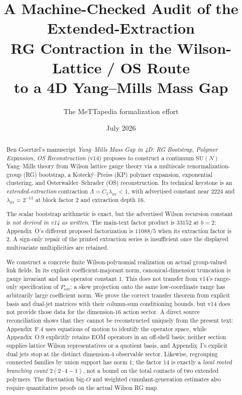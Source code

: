 \documentclass[11pt]{article}
\title{A Machine-Checked Audit of the Extended-Extraction\\
RG Contraction in the Wilson-Lattice / OS Route\\
to a 4D Yang--Mills Mass Gap}
\author{The MeTTapedia formalization effort}
\date{July 2026}
\theoremstyle{definition}
\newcommand{\SUN}{\mathrm{SU}(N)}
\newcommand{\Lirr}{\lambda_{\mathrm{irr}}}
\begin{document}
\maketitle
\sloppy

\begin{abstract}
Ben Goertzel's manuscript \emph{Yang--Mills Mass Gap in 4D: RG Bootstrap,
Polymer Expansion, OS Reconstruction} (v14) proposes to construct a continuum
$\SUN$ Yang--Mills theory from Wilson lattice gauge theory via a multiscale
renormalization-group (RG) bootstrap, a Koteck\'y--Preiss (KP) polymer expansion,
exponential clustering, and Osterwalder--Schrader (OS) reconstruction. Its
technical keystone is an \emph{extended-extraction} contraction
$\Lambda=C_1\Lirr<1$, with advertised constant near $2224$ and
$\Lirr=2^{-13}$ at block factor $2$ and extraction depth $16$.

The scalar bootstrap arithmetic is exact, but the advertised Wilson recursion
constant is \emph{not derived in v14 as written}. The main-text factor product
is $33152$ at $b=2$; Appendix~O's different proposed factorization is
$11088/5$ when its extraction factor is $2$. A sign-only repair of the printed
extraction series is insufficient once the displayed multivariate
multiplicities are retained.

We construct a concrete finite Wilson-polynomial realization on actual
group-valued link fields. In its explicit coefficient-majorant norm,
canonical-dimension truncation is gauge invariant and has operator constant
$1$. This does not transfer from v14's range-only specification of
$P_{\mathrm{ext}}$: a skew projection onto the same low-coordinate range has
arbitrarily large coefficient norm. We prove the correct transfer theorem from
explicit basis and dual-jet matrices with their column-sum conditioning bounds,
but v14 does not provide those data for the dimension-$16$ action sector. A
direct source reconciliation shows that they cannot be reconstructed uniquely
from the present text: Appendix~F.4 uses equations of motion to identify the
operator space, while Appendix~O.9 explicitly retains EOM operators in an
off-shell basis; neither section supplies lattice Wilson representatives or a
quotient basis, and Appendix~I's explicit dual jets stop at the distinct
dimension-$4$ observable sector.
Likewise, regrouping connected families by union support has norm $1$; the
factor $14$ is exactly a \emph{local rooted branching count}
$2(2\cdot4-1)$, not a bound on the total contacts of two extended polymers.
The fluctuation big-$O$ and weighted cumulant-generation estimates also require
quantitative proofs on the actual Wilson RG map.


\end{abstract}
\end{document}

